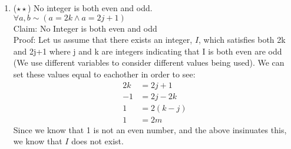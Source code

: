 \documentclass{letter}
\theoremstyle{definition}
\begin{document}
\begin{description}
\begin{enumerate}
		\item ($\star \star$) No integer is both even and odd. \\
$\forall a, b \sim (a=2k \wedge a=2j+1)$ \\
Claim: No Integer is both even and odd \\
Proof: Let us assume that there exists an integer, $I$, which satisfies both 2k and 2j+1 where j and k are integers indicating that I is both even are odd (We use different variables to consider different values being used). We can set these values equal to eachother in order to see:\\
\begin{align*}
2k &= 2j+1 \\
-1 &= 2j-2k \tag{subtracts 2k and -1 from both sides}\\
1 &= 2(k-j)\tag{multiplies -1 by both sides and factors out 2 from 2j-2k}\\
1 &= 2m \tag{Represents k-j as m}
\end{align*}
Since we know that 1 is not an even number, and the above insinuates this, we know that $I$ does not exist. \\


\end{enumerate}
\end{description}
\end{document}
